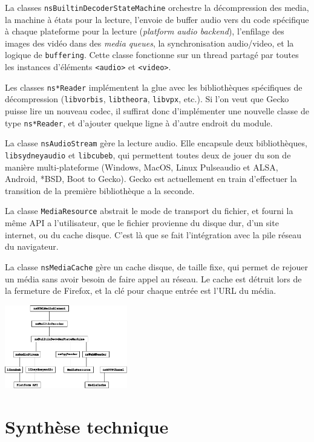\documentclass[a4paper,10pt]{article}
\newcommand{\cc}[1]{\texttt{#1}}
\begin{document}
\begin{multicols}{2}
  La classes \cc{nsBuiltinDecoderStateMachine} orchestre la décompression des
  media, la machine à états pour la lecture, l'envoie de buffer audio vers du
  code spécifique à chaque plateforme pour la lecture (\emph{platform audio
  backend}), l'enfilage des images des vidéo dans des \emph{media queues}, la
  synchronisation audio/video, et la logique de \cc{buffering}. Cette classe
  fonctionne sur un thread partagé par toutes les instances d'éléments
  \cc{<audio>} et \cc{<video>}.

  Les classes \cc{ns*Reader} implémentent la glue avec les bibliothèques
  spécifiques de décompression (\cc{libvorbis}, \cc{libtheora}, \cc{libvpx},
  etc.). Si l'on veut que Gecko puisse lire un nouveau codec, il suffirat donc
  d'implémenter une nouvelle classe de type \cc{ns*Reader}, et d'ajouter quelque
  ligne à d'autre endroit du module.

  La classe \cc{nsAudioStream} gère la lecture audio. Elle encapsule deux
  bibliothèques, \cc{libsydneyaudio} et \cc{libcubeb}, qui permettent toutes
  deux de jouer du son de manière multi-plateforme (Windows, MacOS, Linux
  Pulseaudio et ALSA, Android, *BSD, Boot to Gecko). Gecko est actuellement en
  train d'effectuer la transition de la première bibliothèque a la seconde.

  La classe \cc{MediaResource} abstrait le mode de transport du fichier, et
  fourni la même API a l'utilisateur, que le fichier provienne du disque dur,
  d'un site internet, ou du cache disque. C'est là que se fait l'intégration
  avec la pile réseau du navigateur.

  La classe \cc{nsMediaCache} gère un cache disque, de taille fixe, qui permet
  de rejouer un média sans avoir besoin de faire appel au réseau. Le cache est
  détruit lors de la fermeture de Firefox, et la clé pour chaque entrée est
  l'URL du média.

  \includegraphics[width=0.40\textwidth]{img/content-media.pdf}

  \part{Synthèse technique}

\end{multicols}
\end{document}
